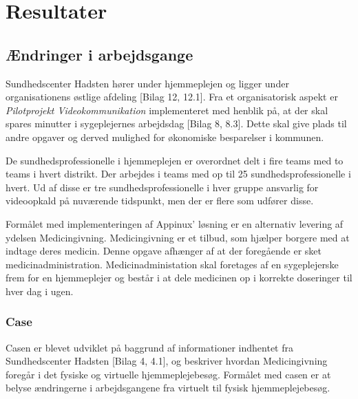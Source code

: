 \section{Resultater}


\subsection{Ændringer i arbejdsgange}
Sundhedscenter Hadsten hører under hjemmeplejen og ligger under organisationens østlige afdeling [Bilag 12, 12.1]. Fra et organisatorisk aspekt er \textit{Pilotprojekt Videokommunikation} implementeret med henblik på, at der skal spares minutter i sygeplejernes arbejdsdag [Bilag 8, 8.3]. Dette skal give plads til andre opgaver og derved mulighed for økonomiske besparelser i kommunen. 

De sundhedsprofessionelle i hjemmeplejen er overordnet delt i fire teams med to teams i hvert distrikt. Der arbejdes i teams med op til 25 sundhedsprofessionelle i hvert. Ud af disse er tre sundhedsprofessionelle i hver gruppe ansvarlig for videoopkald på nuværende tidspunkt, men der er flere som udfører disse.

Formålet med implementeringen af Appinux’ løsning er en alternativ levering af ydelsen Medicingivning. Medicingivning er et tilbud, som hjælper borgere med at indtage deres medicin. Denne opgave afhænger af at der foregående er sket medicinadministration. Medicinadministation skal foretages af en sygeplejerske frem for en hjemmeplejer og består i at dele medicinen op i korrekte doseringer til hver dag i ugen.


\subsubsection{Case}
Casen er blevet udviklet på baggrund af informationer indhentet fra Sundhedscenter Hadsten [Bilag 4, 4.1], og beskriver hvordan Medicingivning foregår i det fysiske og virtuelle hjemmeplejebesøg.
Formålet med casen er at belyse ændringerne i arbejdsgangene fra virtuelt til fysisk hjemmeplejebesøg.

